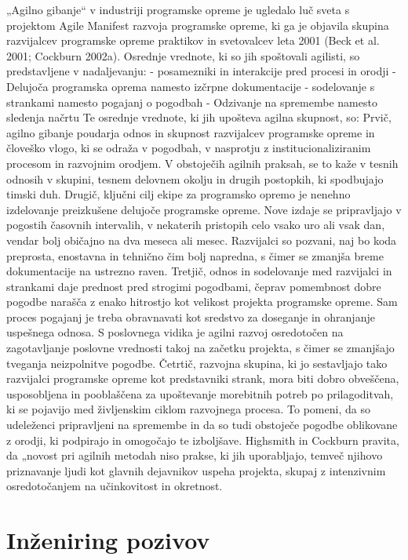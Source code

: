 \documentclass[a4paper,12pt,openright]{book}
\begin{document}
„Agilno gibanje“ v industriji programske opreme je ugledalo luč sveta s projektom Agile Manifest razvoja programske opreme, ki ga je objavila skupina razvijalcev programske opreme praktikov in svetovalcev leta 2001 (Beck et al. 2001; Cockburn 2002a). Osrednje vrednote, ki so jih spoštovali agilisti, so predstavljene v nadaljevanju:
- posamezniki in interakcije pred procesi in orodji
- Delujoča programska oprema namesto izčrpne dokumentacije
- sodelovanje s strankami namesto pogajanj o pogodbah
- Odzivanje na spremembe namesto sledenja načrtu
Te osrednje vrednote, ki jih upošteva agilna skupnost, so:
Prvič, agilno gibanje poudarja odnos in skupnost
razvijalcev programske opreme in človeško vlogo, ki se odraža v pogodbah, v nasprotju z institucionaliziranim procesom in razvojnim orodjem. V obstoječih agilnih praksah, se to kaže v tesnih odnosih v skupini, tesnem delovnem okolju
in drugih postopkih, ki spodbujajo timski duh.
Drugič, ključni cilj ekipe za programsko opremo je nenehno izdelovanje preizkušene delujoče programske opreme. Nove izdaje se pripravljajo v pogostih časovnih intervalih, v nekaterih pristopih celo vsako uro ali vsak dan, vendar bolj običajno na dva meseca ali mesec. 
Razvijalci so pozvani, naj bo koda preprosta, enostavna in tehnično
čim bolj napredna, s čimer se zmanjša breme dokumentacije na ustrezno raven.
Tretjič, odnos in sodelovanje med razvijalci in strankami daje prednost pred strogimi pogodbami, čeprav pomembnost dobre pogodbe narašča z enako hitrostjo kot velikost projekta programske opreme.
Sam proces pogajanj je treba obravnavati kot sredstvo za doseganje in
ohranjanje uspešnega odnosa. S poslovnega vidika je agilni razvoj osredotočen na zagotavljanje poslovne vrednosti takoj na začetku projekta, s čimer se zmanjšajo tveganja neizpolnitve pogodbe.
Četrtič, razvojna skupina, ki jo sestavljajo tako razvijalci programske opreme kot predstavniki strank, mora biti dobro obveščena, usposobljena in pooblaščena za upoštevanje morebitnih potreb po prilagoditvah, ki se pojavijo med življenskim ciklom razvojnega procesa. To pomeni, da so udeleženci pripravljeni na spremembe in da so tudi obstoječe pogodbe oblikovane z orodji, ki podpirajo in omogočajo te
izboljšave.
Highsmith in Cockburn pravita, da „novost pri agilnih metodah niso prakse, ki jih uporabljajo, temveč njihovo priznavanje ljudi kot glavnih dejavnikov uspeha projekta, skupaj z intenzivnim osredotočanjem na učinkovitost in okretnost. 
\cite{DBLP:journals/corr/abs-1709-08439}

\section{Inženiring pozivov}
\end{document}
